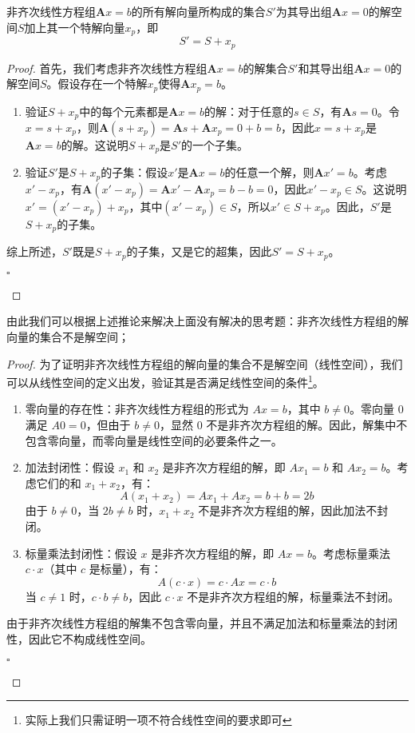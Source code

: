 \begin{corollary}
	非齐次线性方程组$\mathbf{A}x=b$的所有解向量所构成的集合$S'$为其导出组$\mathbf{A}x=0$的解空间$S$加上其一个特解向量$x_p$，即$$S'=S+x_p$$
\end{corollary}

\begin{proof}
	首先，我们考虑非齐次线性方程组$\mathbf{A}x = b$的解集合$S'$和其导出组$\mathbf{A}x = 0$的解空间$S$。假设存在一个特解$x_p$使得$\mathbf{A}x_p = b$。

	\begin{enumerate}
		\item 验证$S + x_p$中的每个元素都是$\mathbf{A}x = b$的解：对于任意的$s \in S$，有$\mathbf{A}s = 0$。令$x = s + x_p$，则$\mathbf{A}(s + x_p) = \mathbf{A}s + \mathbf{A}x_p = 0 + b = b$，因此$x = s + x_p$是$\mathbf{A}x = b$的解。这说明$S + x_p$是$S'$的一个子集。
		\item 验证$S'$是$S + x_p$的子集：假设$x'$是$\mathbf{A}x = b$的任意一个解，则$\mathbf{A}x' = b$。考虑$x' - x_p$，有$\mathbf{A}(x' - x_p) = \mathbf{A}x' - \mathbf{A}x_p = b - b = 0$，因此$x' - x_p \in S$。这说明$x' = (x' - x_p) + x_p$，其中$(x' - x_p) \in S$，所以$x' \in S + x_p$。因此，$S'$是$S + x_p$的子集。
	\end{enumerate}

	综上所述，$S'$既是$S + x_p$的子集，又是它的超集，因此$S' = S + x_p$。
	\begin{flushright}
		$\square$
	\end{flushright}
\end{proof}

由此我们可以根据上述推论来解决上面没有解决的思考题：非齐次线性方程组的解向量的集合不是解空间；

\begin{proof}
	为了证明非齐次线性方程组的解向量的集合不是解空间（线性空间），我们可以从线性空间的定义出发，验证其是否满足线性空间的条件\footnote{实际上我们只需证明一项不符合线性空间的要求即可}。

	\begin{enumerate}
		\item 零向量的存在性：非齐次线性方程组的形式为 $Ax = b$，其中 $b \neq 0$。零向量 $0$ 满足 $A0 = 0$，但由于 $b \neq 0$，显然 $0$ 不是非齐次方程组的解。因此，解集中不包含零向量，而零向量是线性空间的必要条件之一。
		\item 加法封闭性：假设 $x_1$ 和 $x_2$ 是非齐次方程组的解，即 $Ax_1 = b$ 和 $Ax_2 = b$。考虑它们的和 $x_1 + x_2$，有：
		$$
		A(x_1 + x_2) = Ax_1 + Ax_2 = b + b = 2b
		$$
		由于 $b \neq 0$，当 $2b \neq b$ 时，$x_1 + x_2$ 不是非齐次方程组的解，因此加法不封闭。
		\item 标量乘法封闭性：假设 $x$ 是非齐次方程组的解，即 $Ax = b$。考虑标量乘法 $c \cdot x$（其中 $c$ 是标量），有：
		$$
		A(c \cdot x) = c \cdot Ax = c \cdot b
		$$
		当 $c \neq 1$ 时，$c \cdot b \neq b$，因此 $c \cdot x$ 不是非齐次方程组的解，标量乘法不封闭。
	\end{enumerate}

	由于非齐次线性方程组的解集不包含零向量，并且不满足加法和标量乘法的封闭性，因此它不构成线性空间。
	\begin{flushright}
		$\square$
	\end{flushright}
\end{proof}